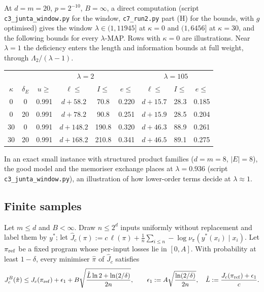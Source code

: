 At $d=m=20$, $p=2^{-10}$, $B=\infty$, a direct computation (script \texttt{c3\_\allowbreak{}junta\_\allowbreak{}window.py} for the window, \texttt{c7\_\allowbreak{}run2.py} part (H) for the bounds, with $g$ optimised) gives the window $\lambda\in(1,11945]$ at $\kappa=0$ and $(1,6456]$ at $\kappa=30$, and the following bounds for every $\lambda$-MAP. Rows with $\kappa=0$ are illustrations. Near $\lambda=1$ the deficiency enters the length and information bounds at full weight, through $\Lambda_2/(\lambda-1)$.

\begin{center}\small
\begin{tabular}{@{}cc|cccc|ccc@{}}
\toprule
& & \multicolumn{4}{c|}{$\lambda=2$} & \multicolumn{3}{c}{$\lambda=105$}\\
$\kappa$ & $\delta_E$ & $u\ge$ & $\ell\le$ & $I\le$ & $e\le$ & $\ell\le$ & $I\le$ & $e\le$\\
\midrule
0 & 0 & 0.991 & $d+58.2$ & 70.8 & 0.220 & $d+15.7$ & 28.3 & 0.185\\
0 & 20 & 0.991 & $d+78.2$ & 90.8 & 0.251 & $d+15.9$ & 28.5 & 0.204\\
30 & 0 & 0.991 & $d+148.2$ & 190.8 & 0.320 & $d+46.3$ & 88.9 & 0.261\\
30 & 20 & 0.991 & $d+168.2$ & 210.8 & 0.341 & $d+46.5$ & 89.1 & 0.275\\
\bottomrule
\end{tabular}
\end{center}

\noindent In an exact small instance with structured product families ($d=m=8$, $|E|=8$), the good model and the memoriser exchange places at $\lambda=0.936$ (script \texttt{c3\_\allowbreak{}junta\_\allowbreak{}window.py}), an illustration of how lower-order terms decide at $\lambda\approx1$.

\subsection{Finite samples}\label{app:teacher:sampled}

\begin{lemma}\label{lem:teacher:finite}
Let $m\le d$ and $B<\infty$. Draw $n\le2^d$ inputs uniformly without replacement and label them by $y^*$; let $\hat J_c(\pi):=c\,\ell(\pi)+\frac1n\sum_{i\le n}-\log\nu_\pi(y^*(x_i)\mid x_i)$. Let $\pi_{\rm ref}$ be a fixed program whose per-input losses lie in $[0,A]$. With probability at least $1-\delta$, every minimiser $\hat\pi$ of $\hat J_c$ satisfies
\[
J^B_c(\hat\pi)\le J_c(\pi_{\rm ref})+\epsilon_1+B\sqrt{\frac{\hat L\ln2+\ln(2/\delta)}{2n}},\qquad \epsilon_1:=A\sqrt{\frac{\ln(2/\delta)}{2n}},\quad\hat L:=\frac{J_c(\pi_{\rm ref})+\epsilon_1}{c}.
\]
\end{lemma}

